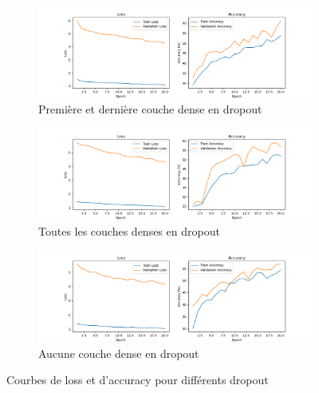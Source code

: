\documentclass{report}
\begin{document}
\begin{figure}[H]
    \centering
    
    \begin{subfigure}{7.7cm}
        \centering
        \includegraphics[width=\linewidth]{Sources/Graphiques/1./LeNet/training_results_LeNet_dropouts_1_0_1.png}
        \caption{Première et dernière couche dense en dropout}
        \label{fig:training_LeNet_dropouts_1_0_1}
    \end{subfigure}
    \hfill
    \begin{subfigure}{7.7cm}
        \centering
        \includegraphics[width=\linewidth]{Sources/Graphiques/1./LeNet/training_results_dropouts_1_1_1.png}
        \caption{Toutes les couches denses en dropout}
        \label{fig:training_LeNet_dropouts_1_1_1}
    \end{subfigure}
    \hfill
    \begin{subfigure}{7.7cm}
        \centering
        \includegraphics[width=\linewidth]{Sources/Graphiques/1./LeNet/training_results_dropouts_0_0_0.png}
        \caption{Aucune couche dense en dropout}
        \label{fig:training_LeNet_dropouts_0_0_0}
    \end{subfigure}
    
    \caption{Courbes de loss et d'accuracy pour différents dropout}
    \label{fig:training_LeNet}
\end{figure}
\end{document}
